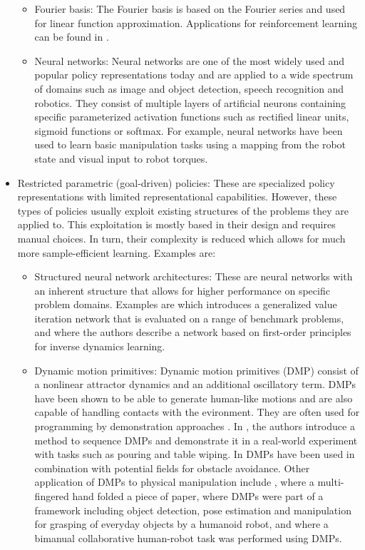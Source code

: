 \begin{itemize}
\begin{itemize}
\item Fourier basis: The Fourier basis is based on the Fourier series and used for linear function approximation. Applications for reinforcement learning can be found in \cite{GeorgeKonidaris.2011,Konidaris.2012}.
\item Neural networks: Neural networks are one of the most widely used and popular policy representations today and are applied to a wide spectrum of domains such as image and object detection, speech recognition and robotics. They consist of multiple layers of artificial neurons containing specific parameterized activation functions such as rectified linear units, sigmoid functions or softmax. For example, neural networks have been used to learn basic manipulation tasks using a mapping from the robot state \cite{Levine.2015} and visual input \cite{Levine.2016} to robot torques. 
\end{itemize}
\item Restricted parametric (goal-driven) policies: These are specialized policy representations with limited representational capabilities. However, these types of policies usually exploit existing structures of the problems they are applied to. This exploitation is mostly based in their design and requires manual choices. In turn, their complexity is reduced which allows for much more sample-efficient learning. Examples are:
\begin{itemize}
\item Structured neural network architectures: These are neural networks with an inherent structure that allows for higher performance on specific problem domains. Examples are \cite{Niu.2018} which introduces a generalized value iteration network that is evaluated on a range of benchmark problems, and \cite{DiazLedezma.2017} where the authors describe a network based on first-order principles for inverse dynamics learning.
\item Dynamic motion primitives: Dynamic motion primitives (DMP) \cite{Schaal.2000,Schaal.2006,Ijspeert.2013} consist of a nonlinear attractor dynamics and an additional oscillatory term. DMPs have been shown to be able to generate human-like motions and are also capable of handling contacts with the evironment. They are often used for programming by demonstration approaches \cite{Matsubara.2011,Kulic.2012,Lee.2011}.
In \cite{Nemec.2012}, the authors introduce a method to sequence DMPs and demonstrate it in a real-world experiment with tasks such as pouring and table wiping. In \cite{Park.2008} DMPs have been used in combination with potential fields for obstacle avoidance. Other application of DMPs to physical manipulation include \cite{Namiki.2015}, where a multi-fingered hand folded a piece of paper, \cite{Mitrevski.2019} where DMPs were part of a framework including object detection, pose estimation and manipulation for grasping of everyday objects by a humanoid robot, and \cite{Nemec.2014} where a bimanual collaborative human-robot task was performed using DMPs.

\end{itemize}
\end{itemize}
